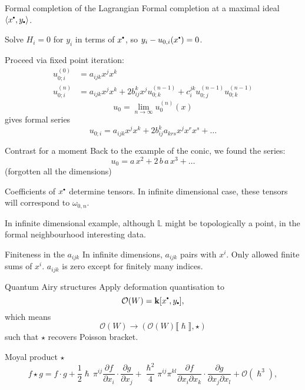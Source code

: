     \begin{frame}{Formal completion of the Lagrangian}
        Formal completion at a maximal ideal \( \langle x^{\sbt}, y_{\sbt} \rangle \).
        
        Solve \(H_i = 0\) for \(y_i \) in terms of \(x^{\sbt}\), so \(y_i -u_{0,i}(x^{\sbt}) = 0\).
        
        Proceed via fixed point iteration:
        \begin{align*} 
        u^{(0)}_{0;i} &=  a_{ijk} x^j x^k \\
        u^{(n)}_{0;i} &=  a_{ijk} x^j x^k + 2 b_{ij}^k x^j u^{(n-1)}_{0;k} + c_i^{jk } u_{0;j}^{(n-1)} u_{0;k}^{(n-1)}
        \end{align*}
        \[ u_0 = \lim_{n \rightarrow \infty} u_0^{(n)}(x) \]
        gives formal series
        \[ u_{0;i} = a_{ijk} x^j x^k + 2 b_{ij}^k a_{krs} x^j x^r x^s + \dots\]
    \end{frame}
    
    
    \begin{frame}{Contrast for a moment}
    Back to the example of the conic, we found the series:
    \[   u_{0} = a \,x^2 + 2 \,b  \, a\, x^3 + \dots\]
    (forgotten all the dimensions)
    \end{frame}

    
    
    \begin{frame}
    Coefficients of \( x^{\sbt}\) determine tensors. In infinite dimensional case, these tensors will correspond to \( \omega_{0,n}\).
    
    In infinite dimensional example, although \( \mathbb{L}\) might be topologically a point, in the formal neighbourhood interesting data.
    \end{frame}
            
    

    
        
    \begin{frame}{Finiteness in the \(a_{ijk}\)}
    In infinite dimensions, \(a_{ijk}\) pairs with \(x^i\). Only allowed finite sums of \(x^i\). \(a_{ijk}\) is zero except for finitely many indices.
    \end{frame}    

    \begin{frame}{Quantum Airy structures}
    Apply deformation quantisation  to 
    \[ \mathcal{O}(W) = \mathbf{k}[ x^{\sbt}, y_{\sbt} ],\] 
    which means 
    \[   \mathcal{O}(W)  \rightarrow ( \mathcal{O}(W) \lBrack \hslash \rBrack , \star) \]
    such that \( \star\) recovers Poisson bracket.
    
    Moyal product \( \star\) 
    \[  f \star g = f \cdot g + \frac{1}{2} \hslash \, \pi^{ij} \frac{\partial f}{\partial x_i} \cdot  \frac{\partial g}{\partial x_j} + \frac{\hslash^2}{4} \pi^{ij} \pi^{kl}\frac{\partial f}{\partial x_i \partial x_k} \cdot \frac{\partial g}{\partial  x_j \partial x_l} + \mathcal{O}(\hslash^3),\] 
    \end{frame}
    
